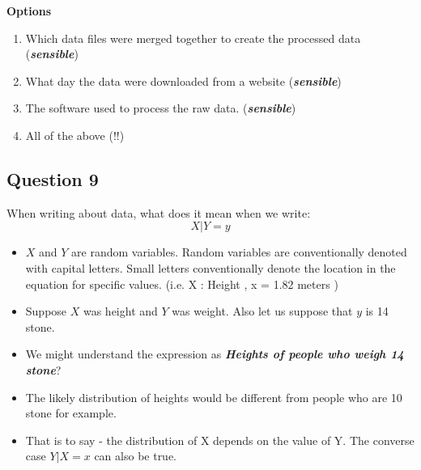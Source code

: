 \documentclass[]{article}
\begin{document}
\bigskip
\textbf{Options}

\begin{enumerate}
\item Which data files were merged together to create the processed data (\textbf{\textit{sensible}})
\item What day the data were downloaded from a website (\textbf{\textit{sensible}})
\item The software used to process the raw data. (\textbf{\textit{sensible}})
\item All of the above (!!)
\end{enumerate}
\newpage
\subsection*{Question 9}
When writing about data, what does it mean when we write: \[ X | Y = y\]

\begin{itemize}
\item $X$ and $Y$ are random variables. Random variables are conventionally denoted with capital letters. Small letters conventionally denote the location in the equation for specific values.
(i.e. X : Height , x = 1.82 meters )
\item Suppose $X$ was height and $Y$ was weight. Also let us suppose that $y$ is 14 stone.
\item We might understand the expression as \textbf{\emph{Heights of people who weigh 14 stone}}?
\item The likely distribution of heights would be different from people who are 10 stone for example.
\item That is to say - the distribution of X depends on the value of Y. The converse case  $Y | X = x$ can also be true.
\end{itemize}

\newpage
\end{document}
